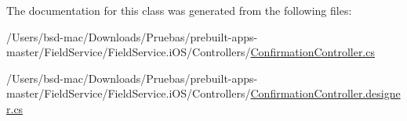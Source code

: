 The documentation for this class was generated from the following files\+:\begin{DoxyCompactItemize}
\item 
/\+Users/bsd-\/mac/\+Downloads/\+Pruebas/prebuilt-\/apps-\/master/\+Field\+Service/\+Field\+Service.\+i\+O\+S/\+Controllers/\hyperlink{_confirmation_controller_8cs}{Confirmation\+Controller.\+cs}\item 
/\+Users/bsd-\/mac/\+Downloads/\+Pruebas/prebuilt-\/apps-\/master/\+Field\+Service/\+Field\+Service.\+i\+O\+S/\+Controllers/\hyperlink{_confirmation_controller_8designer_8cs}{Confirmation\+Controller.\+designer.\+cs}\end{DoxyCompactItemize}
